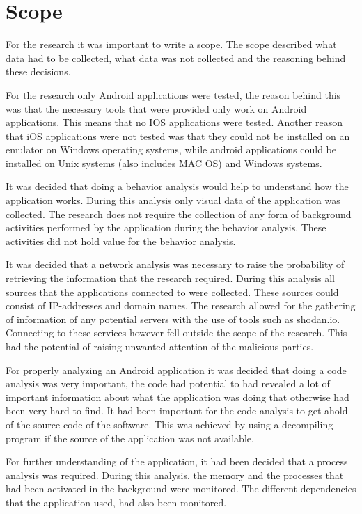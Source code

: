 \section{Scope}

For the research it was important to write a scope. The scope described what data had to be collected, what data was not collected and the reasoning behind these decisions.

For the research only Android applications were tested, the reason behind this was that the necessary tools that were provided only work on Android applications. This means that no IOS applications were tested. Another reason that iOS applications were not tested was that they could not be installed on an emulator on Windows operating systems, while android applications could be installed on Unix systems (also includes MAC OS) and Windows systems.

It was decided that doing a behavior analysis would help to understand how the application works. During this analysis only visual data of the application was collected. The research does not require the collection of any form of background activities performed by the application during the behavior analysis. These activities did not hold value for the behavior analysis.

It was decided that a network analysis was necessary to raise the probability of retrieving the information that the research required. During this analysis all sources that the applications connected to were collected. These sources could consist of IP-addresses and domain names. The research allowed for the gathering of information of any potential servers with the use of tools such as shodan.io. Connecting to these services however fell outside the scope of the research. This had the potential of raising unwanted attention of the malicious parties.

For properly analyzing an Android application it was decided that doing a code analysis was very important, the code had potential to had revealed a lot of important information about what the application was doing that otherwise had been very hard to find. It had been important for the code analysis to get ahold of the source code of the software. This was achieved by using a decompiling program if the source of the application was not available.

For further understanding of the application, it had been decided that a process analysis was required. During this analysis, the memory and the processes that had been activated in the background were monitored. The different dependencies that the application used, had also been monitored.

